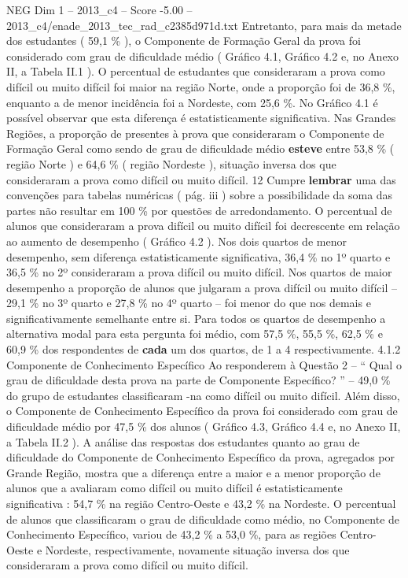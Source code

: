 \begin{textsample}{NEG Dim 1 – 2013\_c4 – Score -5.00 – 2013\_c4/enade\_2013\_tec\_rad\_c2385d971d.txt}
Entretanto, para mais da metade dos estudantes ( 59,1 \% ), o Componente de Formação Geral da prova foi considerado com grau de dificuldade médio ( Gráfico 4.1, Gráfico 4.2 e, no Anexo II, a Tabela II.1 ).
O percentual de estudantes que consideraram a prova como difícil ou muito difícil foi maior na região Norte, onde a proporção foi de 36,8 \%, enquanto a de menor incidência foi a Nordeste, com 25,6 \%.
No Gráfico 4.1 é possível observar que esta diferença é estatisticamente significativa.
Nas Grandes Regiões, a proporção de presentes à prova que consideraram o Componente de Formação Geral como sendo de grau de dificuldade médio \textbf{esteve} entre 53,8 \% ( região Norte ) e 64,6 \% ( região Nordeste ), situação inversa dos que consideraram a prova como difícil ou muito difícil. 12 Cumpre \textbf{lembrar} uma das convenções para tabelas numéricas ( pág. iii ) sobre a possibilidade da soma das partes não resultar em 100 \% por questões de arredondamento.
O percentual de alunos que consideraram a prova difícil ou muito difícil foi decrescente em relação ao aumento de desempenho ( Gráfico 4.2 ).
Nos dois quartos de menor desempenho, sem diferença estatisticamente significativa, 36,4 \% no 1º quarto e 36,5 \% no 2º consideraram a prova difícil ou muito difícil.
Nos quartos de maior desempenho a proporção de alunos que julgaram a prova difícil ou muito difícil – 29,1 \% no 3º quarto e 27,8 \% no 4º quarto – foi menor do que nos demais e significativamente semelhante entre si.
Para todos os quartos de desempenho a alternativa modal para esta pergunta foi médio, com 57,5 \%, 55,5 \%, 62,5 \% e 60,9 \% dos respondentes de \textbf{cada} um dos quartos, de 1 a 4 respectivamente. 4.1.2 Componente de Conhecimento Específico Ao responderem à Questão 2 – “ Qual o grau de dificuldade desta prova na parte de Componente Específico? ” – 49,0 \% do grupo de estudantes classificaram -na como difícil ou muito difícil.
Além disso, o Componente de Conhecimento Específico da prova foi considerado com grau de dificuldade médio por 47,5 \% dos alunos ( Gráfico 4.3, Gráfico 4.4 e, no Anexo II, a Tabela II.2 ).
A análise das respostas dos estudantes quanto ao grau de dificuldade do Componente de Conhecimento Específico da prova, agregados por Grande Região, mostra que a diferença entre a maior e a menor proporção de alunos que a avaliaram como difícil ou muito difícil é estatisticamente significativa : 54,7 \% na região Centro-Oeste e 43,2 \% na Nordeste.
O percentual de alunos que classificaram o grau de dificuldade como médio, no Componente de Conhecimento Específico, variou de 43,2 \% a 53,0 \%, para as regiões Centro-Oeste e Nordeste, respectivamente, novamente situação inversa dos que consideraram a prova como difícil ou muito difícil.

\end{textsample}
